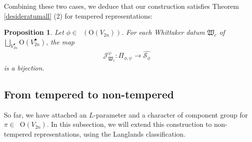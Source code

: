 \documentclass[article]{article}
\numberwithin{equation}{section}
\newtheorem{proposition}[theorem]{Proposition}
\theoremstyle{definition}
\DeclareMathOperator{\Irrt}{Irr_{temp}}
\DeclareMathOperator{\Para}{\Phi_{temp}}
\begin{document}
Combining these two cases, we deduce that our construction satisfies Theorem \ref{desideratumall} (2) for tempered representations:  
\begin{proposition}\label{bijection}
Let $\phi\in \Para(\mathrm O(V_{2n}))$. For each Whittaker datum $\mathfrak W_{c}$ of $\bigsqcup_{V_{2n}^{\bullet}}\mathrm O(V_{2n}^\bullet)$, the map 
	\begin{align*}
	\mathcal J^{\psi}_{\mathfrak W_{c}}: \Pi_{\phi,\psi}\longrightarrow \widehat{\mathcal {S}_{\phi}}
	\end{align*} 
is a bijection. 
\end{proposition}
\subsection{From tempered to non-tempered}\label{nontempered}
So far, we have attached an $L$-parameter and a character of component group for $\pi\in \Irrt \mathrm O(V_{2n})$. In this subsection, we will extend this construction to non-tempered representations, using the Langlands classification.  
\end{document}
